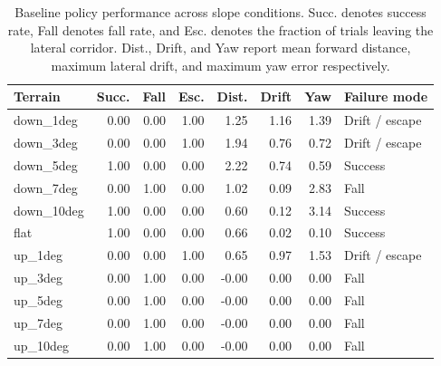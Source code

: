 \begin{table}[h]
\centering
\small
\begin{tabular}{lrrrrrrl}
\hline
Terrain & Succ. & Fall & Esc. & Dist. & Drift & Yaw & Failure mode \\
\hline
down_1deg & 0.00 & 0.00 & 1.00 & 1.25 & 1.16 & 1.39 & Drift / escape \\
down_3deg & 0.00 & 0.00 & 1.00 & 1.94 & 0.76 & 0.72 & Drift / escape \\
down_5deg & 1.00 & 0.00 & 0.00 & 2.22 & 0.74 & 0.59 & Success \\
down_7deg & 0.00 & 1.00 & 0.00 & 1.02 & 0.09 & 2.83 & Fall \\
down_10deg & 1.00 & 0.00 & 0.00 & 0.60 & 0.12 & 3.14 & Success \\
flat & 1.00 & 0.00 & 0.00 & 0.66 & 0.02 & 0.10 & Success \\
up_1deg & 0.00 & 0.00 & 1.00 & 0.65 & 0.97 & 1.53 & Drift / escape \\
up_3deg & 0.00 & 1.00 & 0.00 & -0.00 & 0.00 & 0.00 & Fall \\
up_5deg & 0.00 & 1.00 & 0.00 & -0.00 & 0.00 & 0.00 & Fall \\
up_7deg & 0.00 & 1.00 & 0.00 & -0.00 & 0.00 & 0.00 & Fall \\
up_10deg & 0.00 & 1.00 & 0.00 & -0.00 & 0.00 & 0.00 & Fall \\
\hline
\end{tabular}
\caption{Baseline policy performance across slope conditions. Succ. denotes success rate, Fall denotes fall rate, and Esc. denotes the fraction of trials leaving the lateral corridor. Dist., Drift, and Yaw report mean forward distance, maximum lateral drift, and maximum yaw error respectively.}
\label{tab:baseline_slope_results}
\end{table}
